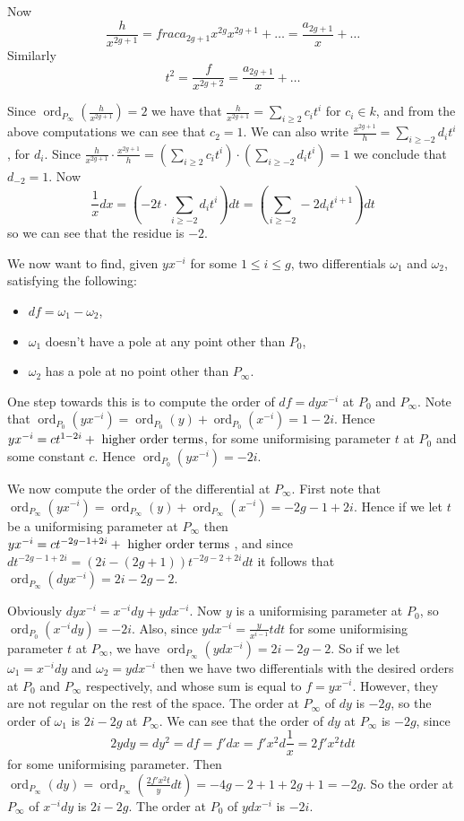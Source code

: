 \documentclass[draft, 11pt]{article} %
\theoremstyle{plain}
\theoremstyle{remark}
\DeclareMathOperator{\ord}{ord}
\begin{document}
Now
\[
\frac{h}{x^{2g+1}} = frac{a_{2g+1}x^{2g}}{x^{2g+1}} + \ldots = \frac{a_{2g+1}}{x} + \ldots 
\]
Similarly 
\[
t^2 = \frac{f}{x^{2g+2} } = \frac{a_{2g+1}}{x} + \ldots
\]

Since $\ord_{P_\infty}\left(\frac{h}{x^{2g+1}}\right) = 2$ we have that $\frac{h}{x^{2g+1}} = \sum_{i\geq 2} c_it^i$ for $c_i\in k$, and from the above computations we can see that $c_2 = 1$.
We can also write $\frac{x^{2g+1}}{h} = \sum_{i\geq -2} d_it^i$, for $d_i$.
Since $\frac{h}{x^{2g+1}} \cdot \frac{x^{2g+1}}{h} = \left( \sum_{i\geq 2} c_it^i\right) \cdot \left( \sum_{i\geq -2} d_it^i\right) = 1$ we conclude that $d_{-2} = 1$.
Now 
\[
\frac{1}{x}dx = \left( -2t \cdot \sum_{i\geq -2} d_it^i\right) dt = \left( \sum_{i\geq -2}-2d_it^{i+1} \right) dt
\]
so we can see that the residue is $-2$.

We now want to find, given $yx^{-i}$ for some $1\leq i \leq g$, two differentials $\omega_1$ and $\omega_2$, satisfying the following:
\begin{itemize}
	\item $df = \omega_1 - \omega_2$,
	\item $\omega_1$ doesn't have a pole at any point other than $P_0$,
	\item $\omega_2$ has a pole at no point other than $P_\infty$.
\end{itemize}

One step towards this is to compute the order of $df = dyx^{-i}$ at $P_0$ and $P_\infty$.
Note that $\ord_{P_0}(yx^{-i}) = \ord_{P_0}(y) + \ord_{P_0}(x^{-i}) = 1 -2i$.
Hence $yx^{-i} = ct^{1-2i} + {\rm \ higher \ order \ terms }$, for some uniformising parameter $t$ at $P_0$ and some constant $c$.
Hence $\ord_{P_0}(yx^{-i}) = -2i$.

We now compute the order of the differential at $P_\infty$.
First note that $\ord_{P_\infty}(yx^{-i})= \ord_{P_\infty}(y) + \ord_{P_\infty}(x^{-i}) = -2g-1+2i.$
Hence if we let $t$ be a uniformising parameter at $P_\infty$ then $yx^{-i} = ct^{-2g-1+2i} + {\rm \ higher \ order \ terms \ }$, and since $dt^{-2g-1+2i} = (2i-(2g+1)) t^{-2g-2+2i}dt$ it follows that $\ord_{P_\infty}(dyx^{-i}) = 2i-2g-2$.


Obviously $dyx^{-i} = x^{-i}dy + ydx^{-i}$.
Now $y$ is a uniformising parameter at $P_0$, so $\ord_{P_0}(x^{-i}dy) = -2i$.
Also, since $ydx^{-i} = \frac{y}{x^{i-1}}tdt$ for some uniformising parameter $t$ at $P_\infty$, we have $\ord_{P_\infty}(ydx^{-i}) = 2i-2g-2$.
So if we let $\omega_1 = x^{-i}dy$ and $\omega_2 = ydx^{-i}$ then we have two differentials with the desired orders at $P_0$ and $P_\infty$ respectively, and whose sum is equal to $f= yx^{-i}$.
However, they are not regular on the rest of the space.
The order at $P_\infty$ of $dy$ is $-2g$, so the order of $\omega_1$ is $2i-2g$ at $P_\infty$.
We can see that the order of $dy$ at $P_\infty$ is $-2g$, since
\[
2ydy = dy^2 = df = f'dx = f'x^2d\frac{1}{x} = 2f'x^2tdt
\]
for some uniformising parameter.
Then $\ord_{P_\infty}(dy) = \ord_{P_\infty}\left (\frac{2f'x^2t}{y}dt \right) = -4g - 2 +1 +2g+1 = -2g$.
So the order at $P_\infty$ of $x^{-i}dy$ is $2i-2g$.
The order at $P_0$ of $ydx^{-i}$ is $-2i$.
\end{document}
